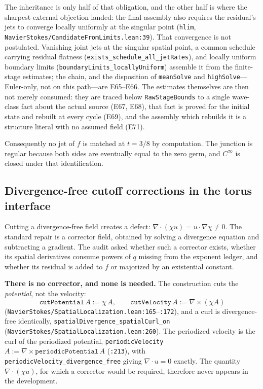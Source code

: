\documentclass[11pt]{article}
\newcommand{\ct}[1]{\texttt{#1}}
\newcommand{\file}[1]{\texttt{\small #1}}
\theoremstyle{plain}
\theoremstyle{definition}
\theoremstyle{remark}
\begin{document}
The inheritance is only half of that obligation, and the other half is where
the sharpest external objection landed: the final assembly also requires the
residual's jets to converge locally uniformly at the singular point
(\ct{hlim}, \file{NavierStokes/CandidateFromLimits.lean:39}). That convergence
is not postulated. Vanishing joint jets at the singular spatial point, a common
schedule carrying residual flatness (\ct{exists\_schedule\_all\_jetRates}), and
locally uniform boundary limits (\ct{boundaryLimits\_locallyUniform}) assemble
it from the finite-stage estimates; the chain, and the disposition of
\ct{meanSolve} and \ct{highSolve}---Euler-only, not on this path---are E65--E66.
The estimates themselves are then not merely consumed: they are traced below
\ct{RawStageBounds} to a single wave-class fact about the actual source (E67,
E68), that fact is proved for the initial state and rebuilt at every cycle
(E69), and the assembly which rebuilds it is a structure literal with no
assumed field (E71).

Consequently no jet of $f$ is matched at $t=3/8$ by computation. The junction is
regular because both sides are eventually equal to the zero germ, and
$C^\infty$ is closed under that identification.

\subsection{Divergence-free cutoff corrections in the torus interface}
\label{sec:divergence-corrector}

Cutting a divergence-free field creates a defect:
$\nabla\cdot(\chi u)=u\cdot\nabla\chi\neq0$. The standard repair is a
corrector field, obtained by solving a divergence equation and subtracting a
gradient. The audit asked whether such a corrector exists, whether its spatial
derivatives consume powers of $q$ missing from the exponent ledger, and whether
its residual is added to $f$ or majorized by an existential constant.

\textbf{There is no corrector, and none is needed.} The construction cuts the
\emph{potential}, not the velocity:
\[
  \ct{cutPotential}\,A:=\chi\,A,\qquad
  \ct{cutVelocity}\,A:=\nabla\times(\chi A)
\]
(\file{NavierStokes/SpatialLocalization.lean:165}--\file{:172}), and a curl is
divergence-free identically, \ct{spatialDivergence\_spatialCurl\_on}
(\file{NavierStokes/SpatialLocalization.lean:260}). The periodized velocity is
the curl of the periodized potential,
\ct{periodicVelocity}\,$A:=\nabla\times\ct{periodicPotential}\,A$
(\file{:213}), with \ct{periodicVelocity\_divergence\_free} giving
$\nabla\cdot u=0$ exactly. The quantity $\nabla\cdot(\chi u)$, for which a
corrector would be required, therefore never appears in the development.
\end{document}
